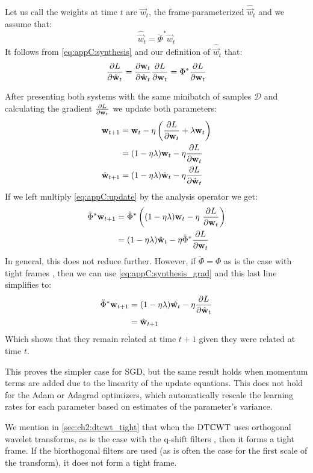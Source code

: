 Let us call the weights at time $t$ are $\vec{w}_t$, the frame-parameterized
$\hat{\vec{w}}_t$ and we assume that:
\begin{equation}
  \hat{\vec{w}}_t = \tilde{\Phi}^* \vec{w}_t \label{eq:appC:initial_condition}
 \end{equation}
 It follows from \eqref{eq:appC:synthesis} and our definition of
 $\hat{\vec{w}}_t$ that:
\begin{equation}
  \frac{\partial L}{\partial \hat{\mathbf{w}}_t} =\frac{\partial \mathbf{w}_t}{\partial \hat{\mathbf{w}}_t} \frac{\partial L}{\partial \mathbf{w}_t} =  {\Phi}^* \frac{\partial L}{\partial \mathbf{w}_t} \label{eq:appC:synthesis_grad}
\end{equation}

After presenting both systems with the same minibatch of samples $\mathcal{D}$
and calculating the gradient $\frac{\partial L}{\partial \mathbf{w}_t}$ we update both parameters:
\begin{align}
  \mathbf{w}_{t+1} & =  \mathbf{w}_t - \eta \left( \frac{\partial L}{\partial \mathbf{w}_t} + \lambda \mathbf{w}_t \right) \\
                &= (1-\eta\lambda)\mathbf{w}_t - \eta \frac{\partial L}{\partial \mathbf{w}_t} \label{eq:appC:update} \\
  \hat{\mathbf{w}}_{t+1} & = (1-\eta\lambda)\hat{\mathbf{w}}_t - \eta \frac{\partial L}{\partial \hat{\mathbf{w}}_t} 
\end{align}
If we left multiply \eqref{eq:appC:update} by the analysis operator we get:
\begin{align}
  \tilde{\Phi}^* \mathbf{w}_{t+1} &= \tilde{\Phi}^* \left( (1-\eta\lambda){\mathbf{w}}_t - \eta\ \frac{\partial L}{\partial {\mathbf{w}}_t}\right) \\       
                               & =  (1-\eta\lambda)\hat{\mathbf{w}}_t - \eta \tilde{\Phi}^* \frac{\partial L}{\partial {\mathbf{w}}_t} 
\end{align}
In general, this does not reduce further. However, if $\tilde{\Phi} =
{\Phi}$ as is the case with tight frames \cite{kovacevic_introduction_2008},
then we can use \eqref{eq:appC:synthesis_grad} and this last line simplifies to:
\begin{align}
  \tilde{\Phi}^* \mathbf{w}_{t+1} &= (1-\eta\lambda)\hat{\mathbf{w}_t} - \eta \frac{\partial L}{\partial \hat{\mathbf{w}}_t} \\
                               &= \hat{\mathbf{w}}_{t+1}
\end{align}
Which shows that they remain related at time $t+1$ given they were
related at time $t$.

This proves the simpler case for SGD, but the same result holds when
momentum terms are added due to the linearity of the update equations. This does
not hold for the Adam \cite{kingma_adam:_2014} or Adagrad
\cite{duchi_adaptive_2011} optimizers, which automatically rescale the learning
rates for each parameter based on estimates of the parameter's variance.

We mention in \autoref{sec:ch2:dtcwt_tight} that when the $\mathrm{DT}\mathbb{C}\mathrm{WT}$ uses orthogonal
wavelet transforms, as is the case with the q-shift filters \cite{kingsbury_dual-tree_2000}, then it
forms a tight frame. If the biorthogonal filters are used (as is often the case
for the first scale of the transform), it does not form a tight frame.
